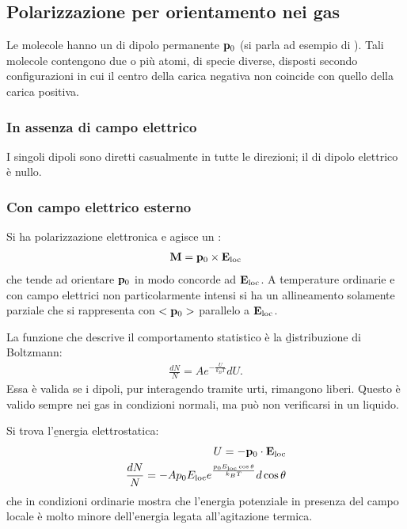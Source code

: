 \subsection{Polarizzazione per orientamento nei gas}
Le molecole hanno un \mom di dipolo permanente $\mathbf{p}_0$ (si parla ad esempio di ). Tali molecole contengono due o più atomi, di specie diverse, disposti secondo configurazioni in cui il centro della carica negativa non coincide con quello della carica positiva.

\subsubsection{In assenza di campo elettrico}
I singoli dipoli sono diretti casualmente in tutte le direzioni; il \mom di dipolo elettrico è nullo.

\subsubsection{Con campo elettrico esterno}
Si ha polarizzazione elettronica e agisce un \mom:
\begin{equation}\begin{split}
\mathbf{M}=\mathbf{p}_0\times\mathbf{E}_{\textrm{loc}}
\end{split}\end{equation}
che tende ad orientare $\mathbf{p}_0$ in modo concorde ad $\mathbf{E}_{\textrm{loc}}$. A temperature ordinarie e con campo elettrici non particolarmente intensi si ha un allineamento solamente parziale che si rappresenta con $<\mathbf{p}_0>$ parallelo a $\mathbf{E}_{\textrm{loc}}$.

La funzione che descrive il comportamento statistico è la \b{distribuzione di Boltzmann}:
\begin{equation}\begin{split}
\frac{dN}{N}=Ae^{-\frac{U}{k_BT}}dU.
\end{split}\end{equation}
Essa è valida se i dipoli, pur interagendo tramite urti, rimangono liberi. Questo è valido sempre nei gas in condizioni normali, ma può non verificarsi in un liquido.

Si trova l'\b{energia elettrostatica}:
\begin{equation}\begin{split}
U=-\mathbf{p}_0\cdot\mathbf{E}_{\textrm{loc}}\\
\frac{dN}{N}=-Ap_0E_{\textrm{loc}}e^{\frac{p_0E_{\textrm{loc}}\cos{\theta}}{k_BT}}d\cos{\theta}
\end{split}\end{equation}
che in condizioni ordinarie mostra che l'energia potenziale in presenza del campo locale è molto minore dell'energia legata all'agitazione termica.

